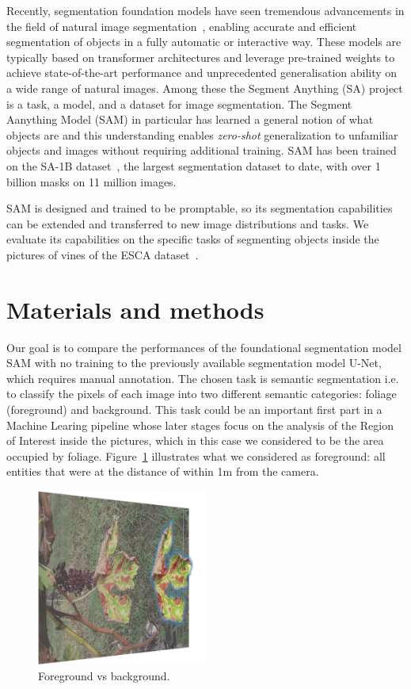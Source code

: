 \documentclass[runningheads]{llncs}
\begin{document}
Recently, segmentation foundation models have seen tremendous advancements in the field of natural image segmentation~\cite{2023-SegGPT}\cite{2023-SEEM}, enabling accurate and efficient segmentation of objects in a fully automatic or interactive way. These models are typically based on transformer architectures and leverage pre-trained weights to achieve state-of-the-art performance and unprecedented generalisation ability on a wide range of natural images. Among these the Segment Anything (SA) project \cite{2023-SAM-Meta} is a task, a model, and a dataset for image segmentation. The Segment Aanything Model (SAM) in particular has learned a general notion of what objects are and this understanding enables \emph{zero-shot} generalization to unfamiliar objects and images without requiring additional training. SAM has been trained on the SA-1B dataset~\cite{SA-1B_dataset}, the largest segmentation dataset to date, with over 1 billion masks on 11 million images. 

SAM is designed and trained to be promptable, so its segmentation capabilities can be extended and transferred to new image distributions and tasks. We evaluate its capabilities on the specific tasks of segmenting objects inside the pictures of vines of the ESCA dataset~\cite{ESCA_dataset}. 

\section{Materials and methods}

Our goal is to compare the performances of the foundational segmentation model SAM with no training to the previously available segmentation model U-Net, which requires manual annotation. The chosen task is semantic segmentation i.e. to classify the pixels of each image into two different semantic categories: foliage (foreground) and background. This task could be an important first part in a Machine Learing pipeline whose later stages focus on the analysis of the Region of Interest inside the pictures, which in this case we considered to be the area occupied by foliage. Figure~\ref{fig:fore_vs_back} illustrates {\color{red} what we considered as foreground: all entities that were at the distance of within 1m from the camera.}

\begin{figure}[h!]
\centering
\includegraphics[width=0.5\textwidth]{imgs/fore_vs_back.png}
\caption{Foreground vs background.}
\label{fig:fore_vs_back}
\end{figure}
\end{document}

